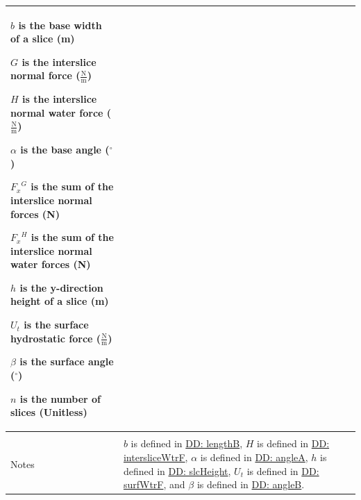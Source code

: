 \documentclass[12pt]{article}
\begin{document}
\begin{minipage}{\textwidth}
\begin{tabular}{p{} p{}}
\begin{symbDescription}
                                                                                           \item{$b$ is the base width of a slice (m)}
                                                                                           \item{$G$ is the interslice normal force ($\frac{\text{N}}{\text{m}}$)}
                                                                                           \item{$H$ is the interslice normal water force  ($\frac{\text{N}}{\text{m}}$)}
                                                                                           \item{$α$ is the base angle (${}^{\circ}$)}
                                                                                           \item{${{F_{x}}^{G}}$ is the sum of the interslice normal forces (N)}
                                                                                           \item{${{F_{x}}^{H}}$ is the sum of the interslice normal water forces (N)}
                                                                                           \item{$h$ is the y-direction height of a slice (m)}
                                                                                           \item{${U_{t}}$ is the surface hydrostatic force ($\frac{\text{N}}{\text{m}}$)}
                                                                                           \item{$β$ is the surface angle (${}^{\circ}$)}
                                                                                           \item{$n$ is the number of slices (Unitless)}
                                                                                           \end{symbDescription}
                                                                                           \\ \midrule \\
                                                                                           Notes & $b$ is defined in \hyperref[DD:lengthB]{DD: lengthB}, $H$ is defined in \hyperref[DD:intersliceWtrF]{DD: intersliceWtrF}, $α$ is defined in \hyperref[DD:angleA]{DD: angleA}, $h$ is defined in \hyperref[DD:slcHeight]{DD: slcHeight}, ${U_{t}}$ is defined in \hyperref[DD:surfWtrF]{DD: surfWtrF}, and $β$ is defined in \hyperref[DD:angleB]{DD: angleB}.

\end{tabular}
\end{minipage}
\end{document}
